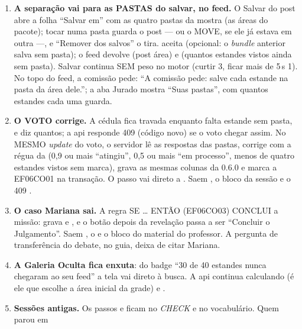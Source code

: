 \begin{enumerate}
  \item \textbf{A separação vai para as PASTAS do salvar, no feed.} O Salvar do
    post abre a folha \enquote{Salvar em} com as quatro pastas da mostra (as
    áreas do pacote); tocar numa pasta guarda o post --- ou o MOVE, se ele já
    estava em outra ---, e \enquote{Remover dos salvos} o tira.
     aceita
     (opcional: o \emph{bundle} anterior salva sem
    pasta); o feed devolve  (post \seta{} área) e 
    (quantos estandes vistos ainda sem pasta). Salvar continua SEM peso no
    motor (curtir 3, ficar mais de 5\,s 1). No topo do feed, a comissão pede:
    \enquote{A comissão pede: salve cada estande na pasta da área dele.}; a
    aba Jurado mostra \enquote{Suas pastas}, com quantos estandes cada uma
    guarda.
  \item \textbf{O VOTO corrige.} A cédula fica travada enquanto falta estande
    sem pasta, e diz quantos; a api responde 409 
    (código novo) se o voto chegar assim. No MESMO \emph{update} do voto, o
    servidor lê as respostas das pastas, corrige com a régua da
     (0,9 ou mais \enquote{atingiu}, 0,5 ou mais \enquote{em
    processo}, menos de quatro estandes vistos sem marca), grava as mesmas
    colunas  da 0.6.0 e marca a EF06CO01 na transação. O
    passo vai direto a . Saem , o bloco  da sessão e o
    409 .
  \item \textbf{O caso Mariana sai.} A regra SE \ldots{} ENTÃO (EF06CO03)
    CONCLUI a missão:  grava  e
    , e o botão depois da revelação passa a ser
    \enquote{Concluir o Julgamento}. Saem , o  e o bloco  do
    material do professor. A pergunta de transferência do debate, no guia,
    deixa de citar Mariana.
  \item \textbf{A Galeria Oculta fica enxuta}: do badge \enquote{30 de 40
    estandes nunca chegaram ao seu feed} a tela vai direto à busca. A api
    continua calculando  (é ele que escolhe a área inicial da
    grade) e .
  \item \textbf{Sessões antigas.} Os passos  e 
    ficam no \emph{CHECK} e no vocabulário. Quem parou em 

\end{enumerate}
